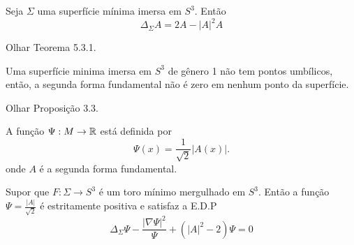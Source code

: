 \begin{teorema}\label{Simon's_identity}
	Seja $\Sigma$ uma superfície mínima imersa em $S^3$. Então
	\begin{equation*}
		\Delta_{\Sigma} A = 2 A - |A|^2 A
	\end{equation*} 
\end{teorema}

\begin{demonstracao}
	Olhar \cite{Simons1968} Teorema 5.3.1.
\end{demonstracao}

\begin{teorema}\label{nao_existem_pontos_umbilicos}
	Uma superfície minima imersa em $S^3$ de gênero 1 não tem pontos umbílicos, então, a segunda forma fundamental não é zero em nenhum ponto da superfície.
\end{teorema}

\begin{demonstracao}
	Olhar \cite{Brendle2013} Proposição 3.3.
\end{demonstracao}

\begin{definicao}
	A função $\Psi: M \rightarrow \mathbb{R}$ está definida por
	\begin{equation*}
	\Psi(x) = \frac{1}{\sqrt{2}} |A(x)|.
	\end{equation*}
	onde $A$ é a segunda forma fundamental.
\end{definicao}

\begin{proposicao}
	Supor que $F: \Sigma \rightarrow S^3$ é um toro mínimo mergulhado em $S^3$. Então a função $\Psi = \frac{|A|}{\sqrt{2}}$ é estritamente positiva e satisfaz a E.D.P
	\begin{equation*}
		\Delta_\Sigma \Psi - \frac{|\nabla \Psi|^2}{\Psi} + (|A|^2 - 2) \Psi = 0
	\end{equation*}
\end{proposicao}


